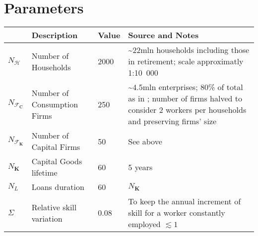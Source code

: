 \documentclass[a4paper, headings=standardclasses]{scrartcl}
\numberwithin{equation}{subsection}
\begin{document}

\section{Parameters}
\begin{xltabular}{\linewidth}{lXlX}
    \toprule
    & Description                                                  & Value & Source and Notes                                                                                                                                            \\
    \toprule \endhead
    \bottomrule \endfoot
    $N_\mathcal{H}$              & Number of Households                                         & 2000 & \textasciitilde 22mln households including those in retirement; scale approximatly 1:10~000 \\
    $N_{\mathcal{F}_\mathbf{C}}$ & Number of Consumption Firms                                  & 250 &  \textasciitilde 4.5mln enterprises; 80\% of total as in \textcite{caiani2016}; number of firms halved to consider 2 workers per households and preserving firms' size                        \\
    $N_{\mathcal{F}_\mathbf{K}}$ & Number of Capital Firms                                      & 50 & See above                                                                                                                                                            \\
    $N_{\mathbf{K}}$             & Capital Goods lifetime                                       & 60 & 5 years                                                                                                                                                           \\
    $N_{L}$             & Loans duration                                      & 60 &     $N_{\mathbf{K}}$                                                                                                                                                         \\
    $\Sigma$                     & Relative skill variation                                     & 0.08 & To keep the annual increment of skill for a worker constantly employed $\lesssim 1$                                                                                                                                   \\

\end{xltabular}
\end{document}
